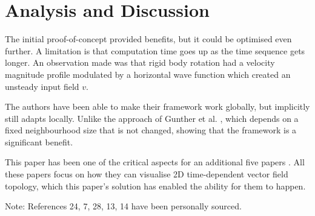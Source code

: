 \documentclass[a4paper,9pt]{article}
\begin{document}

\section{Analysis and Discussion}

The initial proof-of-concept provided benefits, but it could be optimised even further. A limitation is that computation time goes up as the time sequence gets longer. An observation made was that rigid body rotation had a velocity magnitude profile modulated by a horizontal wave function which created an unsteady input field $v$.

The authors have been able to make their framework work globally, but implicitly still adapts locally. Unlike the approach of Gunther et al. \cite{17}, which depends on a fixed neighbourhood size that is not changed, showing that the framework is a significant benefit.

This paper has been one of the critical aspects for an additional five papers \cite{extra1, extra2, extra3, extra4, extra5}. All these papers focus on how they can visualise 2D time-dependent vector field topology, which this paper's solution has enabled the ability for them to happen.




\medskip
\newpage



Note: References 24, 7, 28, 13, 14 have been personally sourced.
\end{document}
